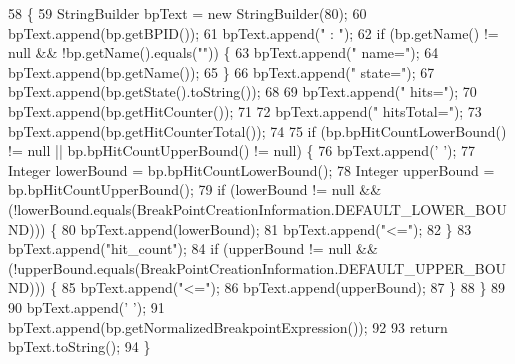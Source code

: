 \begin{DoxyCode}
58                                                                 \{
59     StringBuilder bpText = \textcolor{keyword}{new} StringBuilder(80);
60     bpText.append(bp.getBPID());
61     bpText.append(\textcolor{stringliteral}{" : "});
62     \textcolor{keywordflow}{if} (bp.getName() != null && !bp.getName().equals(\textcolor{stringliteral}{""})) \{
63       bpText.append(\textcolor{stringliteral}{" name="});
64       bpText.append(bp.getName());
65     \}
66     bpText.append(\textcolor{stringliteral}{" state="});
67     bpText.append(bp.getState().toString());
68 
69     bpText.append(\textcolor{stringliteral}{" hits="});
70     bpText.append(bp.getHitCounter());
71 
72     bpText.append(\textcolor{stringliteral}{" hitsTotal="});
73     bpText.append(bp.getHitCounterTotal());
74 
75     \textcolor{keywordflow}{if} (bp.bpHitCountLowerBound() != null || bp.bpHitCountUpperBound() != null) \{
76       bpText.append(\textcolor{charliteral}{' '});
77       Integer lowerBound = bp.bpHitCountLowerBound();
78       Integer upperBound = bp.bpHitCountUpperBound();
79       \textcolor{keywordflow}{if} (lowerBound != null && (!lowerBound.equals(BreakPointCreationInformation.DEFAULT\_LOWER\_BOUND))) \{
80         bpText.append(lowerBound);
81         bpText.append(\textcolor{stringliteral}{"<="});
82       \}
83       bpText.append(\textcolor{stringliteral}{"hit\_count"});
84       \textcolor{keywordflow}{if} (upperBound != null && (!upperBound.equals(BreakPointCreationInformation.DEFAULT\_UPPER\_BOUND))) \{
85         bpText.append(\textcolor{stringliteral}{"<="});
86         bpText.append(upperBound);
87       \}
88     \}
89 
90     bpText.append(\textcolor{charliteral}{' '});
91     bpText.append(bp.getNormalizedBreakpointExpression());
92 
93     \textcolor{keywordflow}{return} bpText.toString();
94   \}
\end{DoxyCode}
